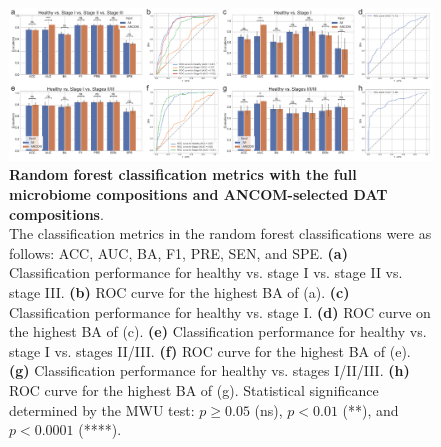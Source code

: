 \documentclass[11pt, a4paper, onecolumn, oneside]{report}
\begin{document}
            \begin{figure}[p]
                \centering
                \includegraphics[width=\linewidth]{Figures/Periodontitis/Figure_R05.pdf}
                \caption[Random forest classification metrics with the full microbiome compositions and ANCOM-selected DAT compositions]{\textbf{Random forest classification metrics with the full microbiome compositions and ANCOM-selected DAT compositions}. \\
                    The classification metrics in the random forest classifications were as follows: ACC, AUC, BA, F1, PRE, SEN, and SPE. \textbf{(a)} Classification performance for healthy vs. stage I vs. stage II vs. stage III. \textbf{(b)} ROC curve for the highest BA of (a). \textbf{(c)} Classification performance for healthy vs. stage I. \textbf{(d)} ROC curve on the highest BA of (c). \textbf{(e)} Classification performance for healthy vs. stage I vs. stages II/III. \textbf{(f)} ROC curve for the highest BA of (e). \textbf{(g)} Classification performance for healthy vs. stages I/II/III. \textbf{(h)} ROC curve for the highest BA of (g). Statistical significance determined by the MWU test: $p \ge 0.05$ (ns), $p < 0.01$ (**), and $p < 0.0001$ (****).}
                \label{fig:Periodontitis-full}
            \end{figure}
            \clearpage
\end{document}
